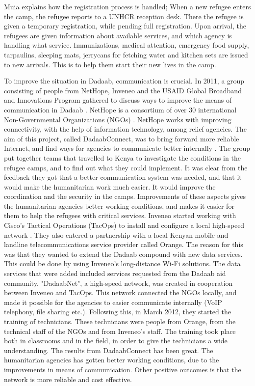 Muia explains how the registration process is handled; When a new refugee enters the camp, the refugee reports to a UNHCR reception desk. There the refugee is given a temporary registration, while pending full registration. Upon arrival, the refugees are given information about available services, and which agency is handling what service. Immunizations, medical attention, emergency food supply, tarpaulins, sleeping mats, jerrycans for fetching water and kitchen sets are issued to new arrivals. This is to help them start their new lives in the camp. 

To improve the situation in Dadaab, communication is crucial. In 2011, a group consisting of people from NetHope, Inveneo and the USAID Global Broadband and Innovations Program gathered to discuss ways to improve the means of communication in Dadaab \cite{dadaab}. NetHope is a consortium of over 30 international Non-Governmental Organizations (NGOs) \cite{nethope}. NetHope works with improving connectivity, with the help of information technology, among relief agencies. The aim of this project, called DadaabConnect, was to bring forward more reliable Internet, and find ways for agencies to communicate better internally \cite{dadaab}. The group put together teams that travelled to Kenya to investigate the conditions in the refugee camps, and to find out what they could implement. It was clear from the feedback they got that a better communication system was needed, and that it would make the humanitarian work much easier. It would improve the coordination and the security in the camps. Improvements of these aspects gives the humanitarian agencies better working conditions, and makes it easier for them to help the refugees with critical services. Inveneo started working with Cisco's Tactical Operations (TacOps) to install and configure a local high-speed network \cite{dadaabinveneo}. They also entered a partnership with a local Kenyan mobile and landline telecommunications service provider called Orange. The reason for this was that they wanted to extend the Dadaab compound with new data services. This could be done by using Inveneo's long-distance Wi-Fi solutions. The data services that were added included services requested from the Dadaab aid community. "DadaabNet", a high-speed network, was created in cooperation between Inveneo and TacOps. This network connected the NGOs locally, and made it possible for the agencies to easier communicate internally (VoIP telephony, file sharing etc.). Following this, in March 2012, they started the training of technicians. These technicians were people from Orange, from the technical staff of the NGOs and from Inveneo's staff. The training took place both in classrooms and in the field, in order to give the technicians a wide understanding. The results from DadaabConnect has been great. The humanitarian agencies has gotten better working conditions, due to the improvements in means of communication. Other positive outcomes is that the network is more reliable and cost effective. 


